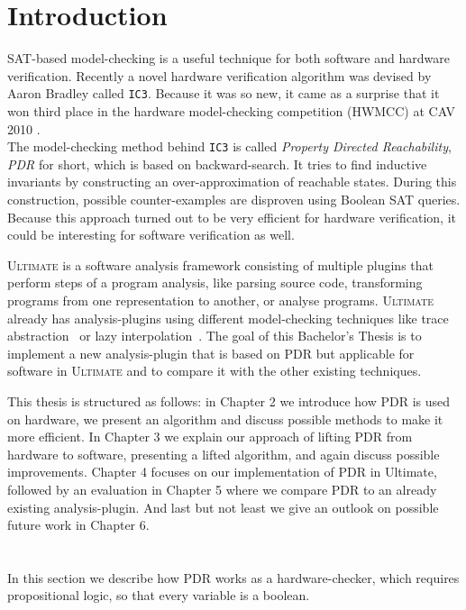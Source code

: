 \documentclass[11pt, a4paper, BCOR=10mm, ngerman]{scrbook}
\begin{document}
\chapter{Introduction}
SAT-based model-checking is a useful technique for both software and hardware verification. 
Recently a novel hardware verification algorithm was devised by Aaron Bradley \cite{DBLP:conf/vmcai/Bradley11} called \texttt{IC3}.
Because it was so new, it came as a surprise that it won third place in the hardware
model-checking competition (HWMCC) at CAV 2010 \cite{cav}. \\ The model-checking method behind \texttt{IC3} is called \textsl{Property Directed Reachability}, \textsl{PDR} for short, which is based on backward-search. It tries to find inductive invariants by constructing an over-approximation of reachable states. During this construction, possible counter-examples are disproven using Boolean SAT queries. Because this approach turned out to be very efficient for hardware verification, it could be interesting for software verification as well. \par
\textsc{\textsc{Ultimate}} \cite{Zitat02} is a software analysis framework consisting of multiple plugins that perform steps of a program analysis, like parsing source code, transforming programs from one representation to another, or analyse programs.
 \textsc{\textsc{Ultimate}} already has analysis-plugins using different model-checking techniques like trace abstraction~\cite{DBLP:conf/cav/HeizmannHP13} or lazy interpolation~\cite{DBLP:conf/popl/HenzingerJMS02}.
The goal of this Bachelor's Thesis is to implement a new analysis-plugin that is based on PDR but applicable for software in \textsc{\textsc{Ultimate}} and to compare it with the other existing techniques. \par

This thesis is structured as follows: in Chapter 2 we introduce how PDR is used on hardware, we present an algorithm and discuss possible methods to make it more efficient. In Chapter 3 we explain our approach of lifting PDR from hardware to software, presenting a lifted algorithm, and again discuss possible improvements. Chapter 4 focuses on our implementation of PDR in Ultimate, followed by an evaluation in Chapter 5 where we compare PDR to an already existing analysis-plugin. And last but not least we give an outlook on possible future work in Chapter 6.


\chapter{}
\label{PDR}
In this section we describe how PDR works as a hardware-checker, which requires propositional logic, so that every variable is a boolean.
\end{document}
